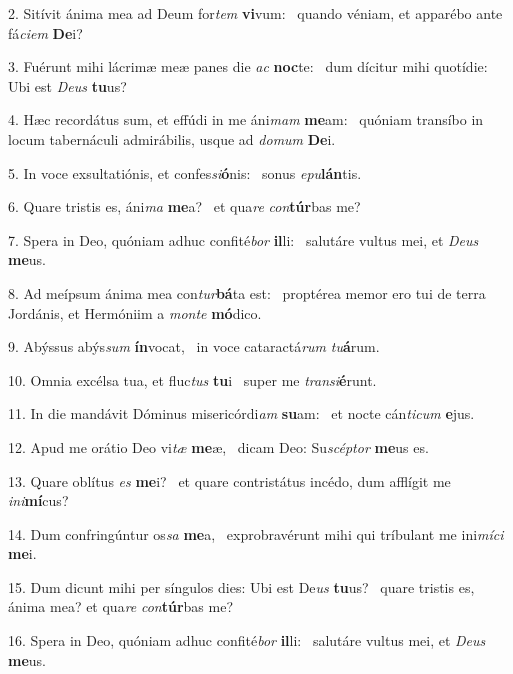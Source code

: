 2. Sitívit ánima mea ad Deum for\textit{tem} \textbf{vi}vum: \ast\  quando véniam, et apparébo ante fá\textit{ci}\textit{em} \textbf{De}i?\

3. Fuérunt mihi lácrimæ meæ panes die \textit{ac} \textbf{noc}te: \ast\  dum dícitur mihi quotídie: Ubi est \textit{De}\textit{us} \textbf{tu}us?\

4. Hæc recordátus sum, et effúdi in me áni\textit{mam} \textbf{me}am: \ast\  quóniam transíbo in locum tabernáculi admirábilis, usque ad \textit{do}\textit{mum} \textbf{De}i.\

5. In voce exsultatiónis, et confes\textit{si}\textbf{ó}nis: \ast\  sonus \textit{e}\textit{pu}\textbf{lán}tis.\

6. Quare tristis es, áni\textit{ma} \textbf{me}a? \ast\  et qua\textit{re} \textit{con}\textbf{túr}bas me?\

7. Spera in Deo, quóniam adhuc confité\textit{bor} \textbf{il}li: \ast\  salutáre vultus mei, et \textit{De}\textit{us} \textbf{me}us.\

8. Ad meípsum ánima mea con\textit{tur}\textbf{bá}ta est: \ast\  proptérea memor ero tui de terra Jordánis, et Hermóniim a \textit{mon}\textit{te} \textbf{mó}dico.\

9. Abýssus abýs\textit{sum} \textbf{ín}vocat, \ast\  in voce cataractá\textit{rum} \textit{tu}\textbf{á}rum.\

10. Omnia excélsa tua, et fluc\textit{tus} \textbf{tu}i \ast\  super me \textit{trans}\textit{i}\textbf{é}runt.\

11. In die mandávit Dóminus misericórdi\textit{am} \textbf{su}am: \ast\  et nocte cán\textit{ti}\textit{cum} \textbf{e}jus.\

12. Apud me orátio Deo vi\textit{tæ} \textbf{me}æ, \ast\  dicam Deo: Su\textit{scép}\textit{tor} \textbf{me}us es.\

13. Quare oblítus \textit{es} \textbf{me}i? \ast\  et quare contristátus incédo, dum afflígit me \textit{in}\textit{i}\textbf{mí}cus?\

14. Dum confringúntur os\textit{sa} \textbf{me}a, \ast\  exprobravérunt mihi qui tríbulant me ini\textit{mí}\textit{ci} \textbf{me}i.\

15. Dum dicunt mihi per síngulos dies: Ubi est De\textit{us} \textbf{tu}us? \ast\  quare tristis es, ánima mea? et qua\textit{re} \textit{con}\textbf{túr}bas me?\

16. Spera in Deo, quóniam adhuc confité\textit{bor} \textbf{il}li: \ast\  salutáre vultus mei, et \textit{De}\textit{us} \textbf{me}us.\

